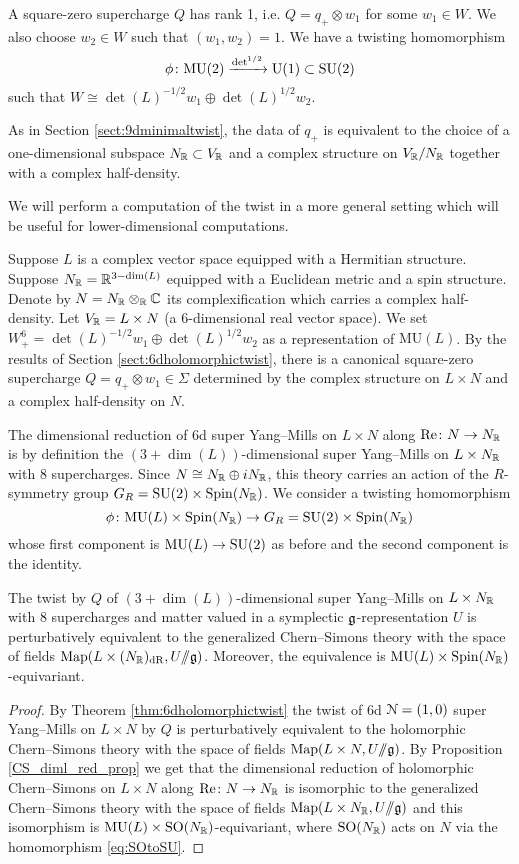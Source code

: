 \documentclass[10pt, oneside]{article}
\newcommand{\MU}{\mathrm{MU}}
\renewcommand{\Re}{\mathrm{Re}}
\renewcommand{\U}{\mathrm{U}}
\newcommand{\ham}{/\!\!/}
\begin{document}
A square-zero supercharge $Q$ has rank 1, i.e. $Q=q_+\otimes w_1$ for some $w_1\in W$. We also choose $w_2\in W$ such that $(w_1, w_2) = 1$. We have a twisting homomorphism
\[\phi\colon\MU(2)\xrightarrow{\det^{1/2}}\U(1)\subset \SU(2)\]
such that $W\cong \det(L)^{-1/2} w_1\oplus \det(L)^{1/2} w_2$.

As in Section \ref{sect:9dminimaltwist}, the data of $q_+$ is equivalent to the choice of a one-dimensional subspace $N_\mathbb R\subset V_\mathbb R$ and a complex structure on $V_\mathbb R/N_\mathbb R$ together with a complex half-density.

We will perform a computation of the twist in a more general setting which will be useful for lower-dimensional computations.

Suppose $L$ is a complex vector space equipped with a Hermitian structure. Suppose $N_\mathbb R=\mathbb R^{3-\dim(L)}$ equipped with a Euclidean metric and a spin structure. Denote by $N=N_\mathbb R\otimes_\mathbb R\mathbb C$ its complexification which carries a complex half-density. Let $V_\mathbb R=L\times N$ (a 6-dimensional real vector space). We set $W^6_+=\det(L)^{-1/2}w_1\oplus \det(L)^{1/2} w_2$ as a representation of $\MU(L)$. By the results of Section \ref{sect:6dholomorphictwist}, there is a canonical square-zero supercharge $Q=q_+\otimes w_1\in\Sigma$ determined by the complex structure on $L\times N$ and a complex half-density on $N$.

The dimensional reduction of 6d super Yang--Mills on $L\times N$ along $\Re\colon N\rightarrow N_\RR$ is by definition the $(3+\dim(L))$-dimensional super Yang--Mills on $L\times N_\mathbb R$ with 8 supercharges. Since $N\cong N_\mathbb R\oplus iN_\mathbb R$, this theory carries an action of the $R$-symmetry group $G_R=\mathrm{SU}(2)\times \mathrm{Spin}(N_\mathbb R)$. We consider a twisting homomorphism
\[\phi\colon \MU(L)\times \Spin(N_\RR)\rightarrow G_R=\SU(2)\times \Spin(N_\RR)\]
whose first component is $\MU(L)\rightarrow \SU(2)$ as before and the second component is the identity.

\begin{theorem}
The twist by $Q$ of $(3+\dim(L))$-dimensional super Yang--Mills on $L\times N_\mathbb R$ with 8 supercharges and matter valued in a symplectic $\mathfrak g$-representation $U$ is perturbatively equivalent to the generalized Chern--Simons theory with the space of fields $\map(L\times (N_\RR)_{\mr{dR}}, U\ham \fg)$. Moreover, the equivalence is $\MU(L)\times \Spin(N_\RR)$-equivariant.
\label{thm:6dCSreduction}
\end{theorem}
\begin{proof}
By Theorem \ref{thm:6dholomorphictwist} the twist of 6d $\mathcal N=(1, 0)$ super Yang--Mills on $L\times N$ by $Q$ is perturbatively equivalent to the holomorphic Chern--Simons theory with the space of fields $\map(L\times N, U\ham \fg)$. By Proposition \ref{CS_diml_red_prop} we get that the dimensional reduction of holomorphic Chern--Simons on $L\times N$ along $\Re\colon N\rightarrow N_\RR$ is isomorphic to the generalized Chern--Simons theory with the space of fields $\map(L\times N_\RR, U\ham\fg)$ and this isomorphism is $\MU(L)\times \SO(N_\RR)$-equivariant, where $\mathrm{SO}(N_\mathbb R)$ acts on $N$ via the homomorphism \eqref{eq:SOtoSU}.
\end{proof}
\end{document}
